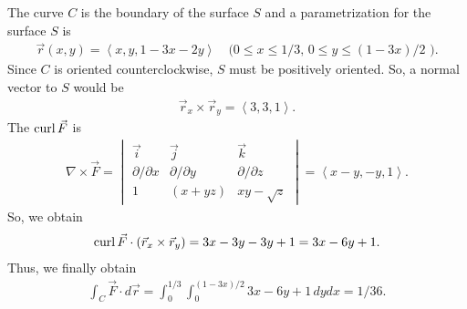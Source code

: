 	The curve $C$ is the boundary of the surface $S$ and a parametrization for the surface $S$ is
		\begin{align*}
		\vec{r} (x, y) = \left\langle x ,y , 1 - 3x - 2y \right\rangle \quad \text{(}0 \leq x \leq 1/3, \, 0 \leq y \leq (1 - 3x)/2 \text{ )} .
		\end{align*}
	Since $C$ is oriented counterclockwise, $S$ must be positively oriented. So, a normal vector to $S$ would be
		\begin{align*}
		\vec{r}_x \times \vec{r}_y = \left\langle 3, 3, 1 \right\rangle .
		\end{align*}
	The $\mathrm{curl}\, \vec{F}$ is
		\begin{align*}
		\nabla \times \vec{F} = \begin{vmatrix}
		\vec{i} &  \vec{j} & \vec{k} \\
		\partial/\partial x & \partial / \partial y & \partial / \partial z \\
		1 & (x + yz) & xy - \sqrt{z}
		\end{vmatrix}
		= \left\langle x - y , -y , 1 \right\rangle .
		\end{align*}
	So, we obtain
		\begin{align*}
		\mathrm{curl}\, \vec{F} \cdot (\vec{r}_x \times \vec{r}_y ) = 3x - 3y - 3y + 1 = 3x - 6y + 1 .
		\end{align*}
	Thus, we finally obtain
		\begin{align*}
		\int_C \vec{F} \cdot d\vec{r} = \int_0^{1/3} \int_0^{(1 - 3x)/2} 3x - 6y + 1 \, dy dx = 1/36 .
		\end{align*}

